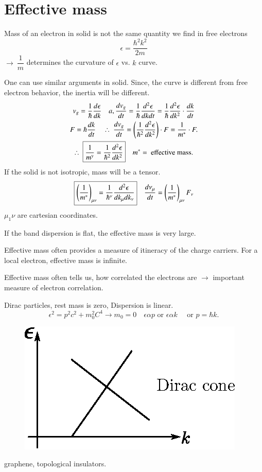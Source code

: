 \section*{Effective mass}

Mass of an electron in solid is not the same quantity we find in free electrons
$$
\epsilon=\dfrac{\hbar^{2}k^{2}}{2m}
$$
$\to \ \dfrac{1}{m}$ determines the curvature of $\epsilon$ vs. $k$ curve.

One can use similar arguments in solid. Since, the curve is different from free electron behavior, the inertia will be different.
\begin{gather*}
v_{g}=\dfrac{1}{\hbar}\dfrac{d\epsilon}{dk}\quad a, \dfrac{dv_{g}}{dt}=\dfrac{1}{\hbar}\dfrac{d^{2}\epsilon}{dkdt}=\dfrac{1}{\hbar}\dfrac{d^{2}\epsilon}{dk^{2}}\cdot \dfrac{dk}{dt}\\
F=\hbar \dfrac{dk}{dt}\quad \therefore \ \dfrac{dv_{g}}{dt}=\left(\dfrac{1}{\hbar^{2}}\dfrac{d^{2}\epsilon}{dk^{2}}\right)\cdot F=\dfrac{1}{m^{*}}\cdot F.\\
\therefore \ \fbox{$\dfrac{1}{m^{y}}=\dfrac{1}{\hbar^{2}}\dfrac{d^{2}\epsilon}{dk^{2}}$}\quad m^{*} = \text{ effective mass.}
\end{gather*}
If the solid is not isotropic, mass will be a tensor.
$$
\fbox{$\left(\dfrac{1}{m^{*}}\right)_{\mu\nu}=\dfrac{1}{\hbar^{\nu}}\dfrac{d^{2}\epsilon}{dk_{\mu}dk_{\nu}}$}\quad \dfrac{d\nu_{\mu}}{dt}=\left(\dfrac{1}{m^{*}}\right)_{\mu\nu}F_{\nu}
$$
$\mu_{1}\nu$ are cartesian coordinates.

If the band dispersion is flat, the effective mass is very large.

Effective mass often provides a measure of itineracy of the charge carriers. For a local electron, effective mass is infinite.

Effective mass often tells us, how correlated the electrons are $\to$ important measure of electron correlation.

Dirac particles, rest mass is zero, Dispersion is linear.
$$
\epsilon^{2}=p^{2}c^{2}+m^{2}_{0}C^{4}\to m_{0}=0\quad \epsilon\alpha p\text{ or } \epsilon\alpha k\quad \text{ or } p=\hbar k.
$$
\begin{figure}[H]
\centering
\includegraphics[scale=.85]{images/lecture23/fig6.eps}
\end{figure}
graphene, topological insulators.


